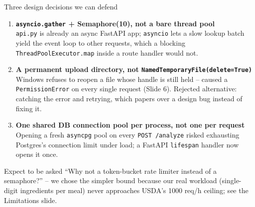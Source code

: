 \documentclass[aspectratio=169,11pt]{beamer}
\begin{document}
\begin{frame}{Three design decisions we can defend}
  \begin{enumerate}\setlength\itemsep{0.6em}
    \item \textbf{\texttt{asyncio.gather} + Semaphore(10), not a bare thread pool}\\
      \texttt{api.py} is already an async FastAPI app; \texttt{asyncio} lets a slow lookup batch yield the event loop to other requests, which a blocking \texttt{ThreadPoolExecutor.map} inside a route handler would not.
    \item \textbf{A permanent upload directory, not \texttt{NamedTemporaryFile(delete=True)}}\\
      Windows refuses to reopen a file whose handle is still held -- caused a \texttt{PermissionError} on every single request (Slide 6). Rejected alternative: catching the error and retrying, which papers over a design bug instead of fixing it.
    \item \textbf{One shared DB connection pool per process, not one per request}\\
      Opening a fresh \texttt{asyncpg} pool on every \texttt{POST /analyze} risked exhausting Postgres's connection limit under load; a FastAPI \texttt{lifespan} handler now opens it once.
  \end{enumerate}

  \vspace{0.4em}
  \begin{block}{Expect to be asked}
    ``Why not a token-bucket rate limiter instead of a semaphore?'' -- we chose the simpler bound because our real workload (single-digit ingredients per meal) never approaches USDA's 1000 req/h ceiling; see the Limitations slide.
  \end{block}
\end{frame}
\end{document}
